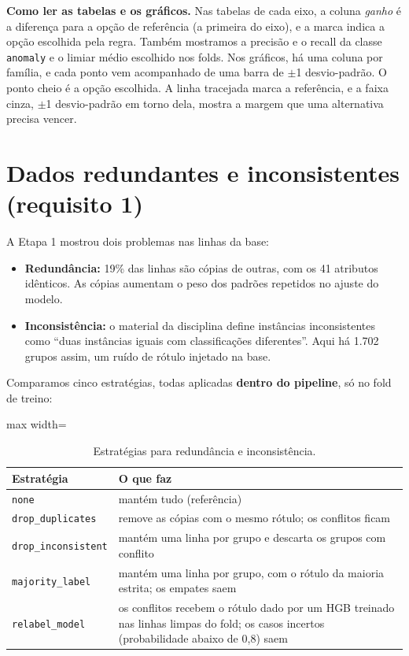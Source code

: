 \documentclass[11pt,a4paper]{article}
\begin{document}
\textbf{Como ler as tabelas e os gráficos.} Nas tabelas de cada eixo, a coluna \emph{ganho} é a diferença para a opção de referência (a primeira do eixo), e a marca \checkmark{} indica a opção escolhida pela regra. Também mostramos a precisão e o recall da classe \texttt{anomaly} e o limiar médio escolhido nos folds. Nos gráficos, há uma coluna por família, e cada ponto vem acompanhado de uma barra de $\pm$1 desvio-padrão. O ponto cheio é a opção escolhida. A linha tracejada marca a referência, e a faixa cinza, $\pm$1 desvio-padrão em torno dela, mostra a margem que uma alternativa precisa vencer.

\section{Dados redundantes e inconsistentes (requisito 1)}

A Etapa 1 mostrou dois problemas nas linhas da base:
\begin{itemize}
\item \textbf{Redundância:} 19\% das linhas são cópias de outras, com os 41 atributos idênticos. As cópias aumentam o peso dos padrões repetidos no ajuste do modelo.
\item \textbf{Inconsistência:} o material da disciplina define instâncias inconsistentes como ``duas instâncias iguais com classificações diferentes''. Aqui há 1.702 grupos assim, um ruído de rótulo injetado na base.
\end{itemize}

Comparamos cinco estratégias, todas aplicadas \textbf{dentro do pipeline}, só no fold de treino:

\begin{table}[H]
\centering
\caption{Estratégias para redundância e inconsistência.}
\begin{adjustbox}{max width=\linewidth}
\begin{tabular}{lp{11cm}}
\toprule
Estratégia & O que faz \\
\midrule
\texttt{none} & mantém tudo (referência) \\
\texttt{drop\_duplicates} & remove as cópias com o mesmo rótulo; os conflitos ficam \\
\texttt{drop\_inconsistent} & mantém uma linha por grupo e descarta os grupos com conflito \\
\texttt{majority\_label} & mantém uma linha por grupo, com o rótulo da maioria estrita; os empates saem \\
\texttt{relabel\_model} & os conflitos recebem o rótulo dado por um HGB treinado nas linhas limpas do fold; os casos incertos (probabilidade abaixo de 0,8) saem \\
\bottomrule
\end{tabular}
\end{adjustbox}
\end{table}
\end{document}
